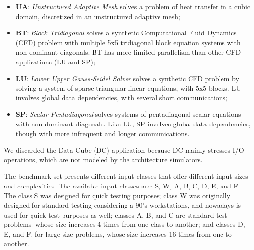 \documentclass[AMA,final,STIX1COL]{WileyNJD-v2}
\begin{document}
\begin{itemize}
\item \textbf{UA}: \emph{Unstructured Adaptive Mesh} solves a problem of heat transfer in a cubic domain, discretized in an unstructured adaptive mesh;

\item \textbf{BT}: \emph{Block Tridiagonal} solves a synthetic Computational Fluid Dynamics (CFD) problem with multiple 5x5 tridiagonal block equation systems with non-dominant diagonals. BT has more limited parallelism than other CFD applications (LU and SP);

\item \textbf{LU}: \emph{Lower Upper Gauss-Seidel Solver} solves a synthetic CFD problem by solving a system of sparse triangular linear equations, with 5x5 blocks. LU involves global data dependencies, with several short communications;

\item \textbf{SP}: \emph{Scalar Pentadiagonal} solves systems of pentadiagonal scalar equations with non-dominant diagonals. 
Like LU, SP involves global data dependencies, though with more infrequent and longer communications.

\end{itemize}

We discarded the Data Cube (DC) application because DC mainly stresses I/O operations, which are not modeled by the architecture simulators.

The benchmark set presents different input classes that offer different input sizes and complexities.
The available input classes are: S, W, A, B, C, D, E, and F.
The class S was designed for quick testing purposes; class W was originally designed for standard testing considering a 90's workstations, and nowadays is used for quick test purposes as well; classes A, B, and C are standard test problems, whose size increases 4 times from one class to another; and classes D, E, and F, for large size problems, whose size increases 16 times from one to another.
\end{document}
